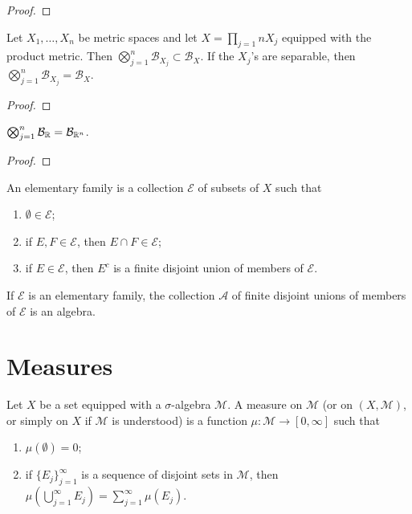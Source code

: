 \begin{proof}
    
\end{proof}

\begin{proposition}
Let $X_1, \dots, X_n$ be metric spaces and let $X = \prod_{j=1}{n} X_j$ equipped with the product metric.
Then $\bigotimes_{j=1}^{n} \mathcal{B}_{X_j} \subset \mathcal{B}_{X}$.
If the $X_j$'s are separable, then $\bigotimes_{j=1}^{n} \mathcal{B}_{X_j} = \mathcal{B}_{X}$.
\end{proposition}

\begin{proof}
    
\end{proof}

\begin{corollary}
$\bigotimes_{j=1}^{n} \mathcal{B}_{\mathbb{R}} = \mathcal{B}_{\mathbb{R}^n}$.
\end{corollary}

\begin{proof}
    
\end{proof}

\begin{definition}
An elementary family is a collection $\mathcal{E}$ of subsets of $X$ such that
\begin{enumerate}
    \item $\emptyset \in \mathcal{E}$;
    \item if $E, F \in \mathcal{E}$, then $E \cap F \in \mathcal{E}$;
    \item if $E \in \mathcal{E}$, then $E^c$ is a finite disjoint union of members of $\mathcal{E}$.
\end{enumerate}
\end{definition}

\begin{proposition}
If $\mathcal{E}$ is an elementary family, the collection $\mathcal{A}$ of finite disjoint unions of members of $\mathcal{E}$ is an algebra.
\end{proposition}

\section{Measures}

\begin{definition}[Measure]
Let $X$ be a set equipped with a $\sigma$-algebra $\mathcal{M}$.
A measure on $\mathcal{M}$ (or on $(X, \mathcal{M})$, or simply on $X$ if $\mathcal{M}$ is understood) is a function $\mu: \mathcal{M} \to [0, \infty]$ such that
\begin{enumerate}
    \item $\mu(\emptyset) = 0$;
    \item if $\{ E_j \}_{j=1}^{\infty}$ is a sequence of disjoint sets in $\mathcal{M}$, then $\mu(\bigcup_{j=1}^{\infty} E_j) = \sum _{j=1}^{\infty} \mu(E_j)$.
\end{enumerate}
\end{definition}

